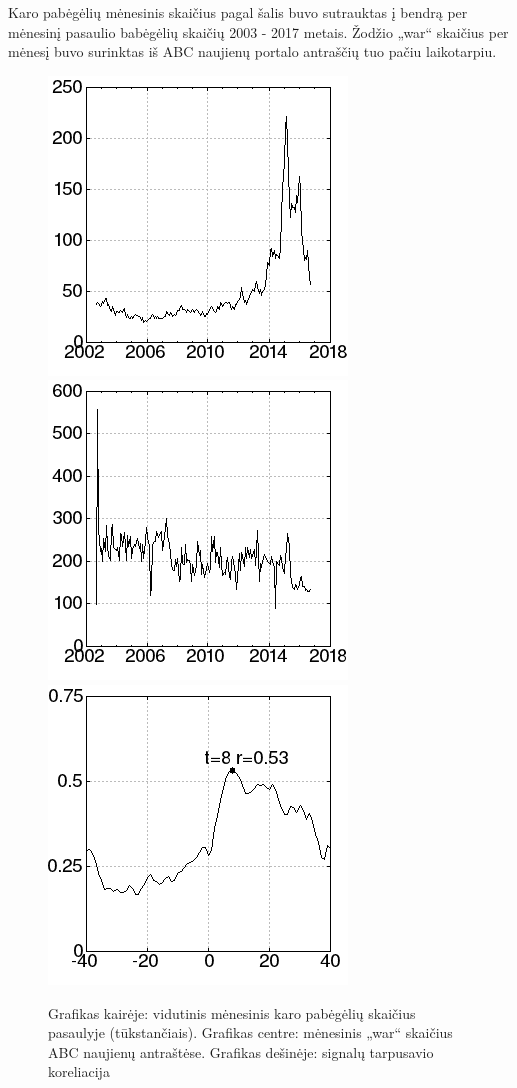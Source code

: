 Karo pabėgėlių mėnesinis skaičius pagal šalis\cite{refugees} buvo sutrauktas į bendrą per mėnesinį pasaulio babėgėlių skaičių 2003 - 2017 metais.
Žodžio „war“ skaičius per mėnesį buvo surinktas iš ABC naujienų portalo antraščių\cite{abcNews} tuo pačiu laikotarpiu.

\begin{figure}
\includegraphics[scale=0.65]{../scripts/refugees_war/refugees.png}
\includegraphics[scale=0.65]{../scripts/refugees_war/war.png}
\includegraphics[scale=0.65]{../scripts/refugees_war/result.png}
    \caption{Grafikas kairėje: vidutinis mėnesinis karo pabėgėlių skaičius pasaulyje (tūkstančiais). Grafikas centre: mėnesinis „war“ skaičius ABC naujienų antraštėse. Grafikas dešinėje: signalų tarpusavio koreliacija}
\end{figure}

